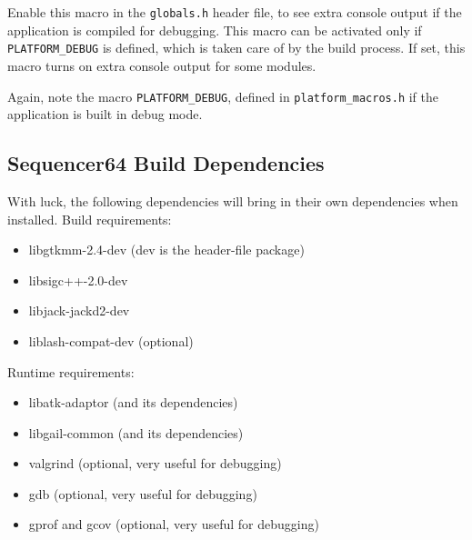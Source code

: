       Enable this macro in the
      \texttt{globals.h} header file, to see extra console
      output if the application is compiled for debugging.  This macro can be
      activated only if \texttt{PLATFORM\_DEBUG} is defined, which is taken
      care of by the build process.  If set, this macro turns on extra
      console output for some modules.


      Again, note the macro \texttt{PLATFORM\_DEBUG},
      defined in \texttt{platform\_macros.h} if the application is
      built in debug mode.

\subsection{Sequencer64 Build Dependencies}
\label{subsec:seq64_build_dependencies}

   With luck, the following dependencies will bring in their own
   dependencies when installed.  Build requirements:

     \begin{itemize}
        \item libgtkmm-2.4-dev (dev is the header-file package)
        \item libsigc++-2.0-dev
        \item libjack-jackd2-dev
        \item liblash-compat-dev (optional)
     \end{itemize}

   Runtime requirements:

     \begin{itemize}
        \item libatk-adaptor (and its dependencies)
        \item libgail-common (and its dependencies)
        \item valgrind (optional, very useful for debugging)
        \item gdb (optional, very useful for debugging)
        \item gprof and gcov (optional, very useful for debugging)
     \end{itemize}


